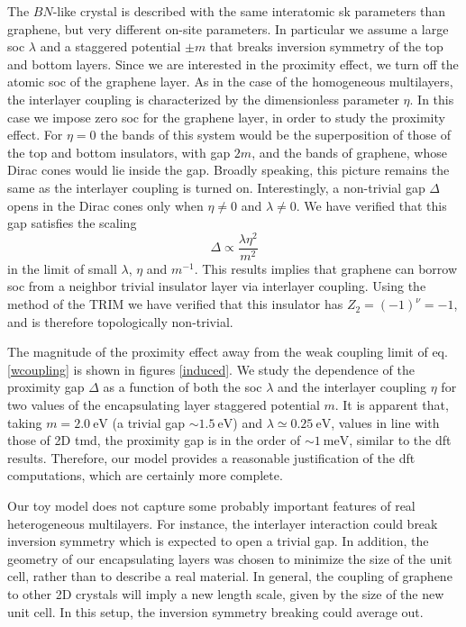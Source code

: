 The $BN$-like crystal is described with the same interatomic \ac{sk} parameters than graphene, but very different on-site parameters. In particular we assume a large \ac{soc} $\lambda$ and a staggered potential $\pm m$ that breaks inversion symmetry of the top and bottom layers.
Since we are interested in the proximity effect, we turn off the atomic \ac{soc} of the graphene layer.
As in the case of the homogeneous multilayers, the interlayer coupling is characterized by the dimensionless parameter $\eta$.   In this case we impose
zero \ac{soc} for the graphene layer, in order to study the proximity effect.   For $\eta=0$ the bands of this system would be the superposition of those of the top and bottom insulators, with gap $2m$, and the bands of graphene, whose Dirac cones would lie inside the gap.  Broadly speaking, this picture remains the same as the interlayer coupling is turned on.    Interestingly, a non-trivial gap $\Delta$  opens in the Dirac cones only when $\eta\neq 0$ and $\lambda\neq 0$.  We have verified that this gap satisfies the  scaling
\begin{equation}
\Delta \propto \frac{\lambda \eta^2}{m^{2}}
\label{wcoupling}
\end{equation}
in the limit of small $\lambda$, $\eta$ and $m^{-1}$. This results implies that graphene can borrow \ac{soc} from a neighbor trivial insulator layer via interlayer coupling. Using the method of the TRIM  we have verified that this insulator has $Z_2=(-1)^{\nu}=-1$, and is therefore topologically non-trivial.

The magnitude of the proximity effect away from the weak coupling limit of eq. \eqref{wcoupling} is shown in figures \ref{induced}.  We study the dependence of the proximity gap $\Delta$ as a function of both the \ac{soc} $\lambda$ and the interlayer coupling $\eta$ for two values of the encapsulating layer  staggered potential $m$. It is apparent that, taking $m=\SI{2.0}{\eV}$ (a trivial gap $\sim\SI{1.5}{\eV}$) and $\lambda \simeq \SI{0.25}{\eV}$, values in line with those of 2D \ac{tmd}, the proximity gap is in the order of
 $\sim\SI{1}{\meV}$, similar to the \ac{dft} results. Therefore, our model provides a reasonable justification of the \ac{dft} computations, which are certainly more complete.

Our  toy model does not capture some probably important features of real heterogeneous multilayers.  For instance,
the interlayer interaction  could break inversion symmetry which is expected to open a trivial gap.  In addition,
the geometry of our encapsulating  layers was  chosen to minimize the size of the unit cell, rather than to describe a real material.  In general, the coupling of graphene to other 2D crystals will imply a new length scale, given by the size of the new unit cell. In this setup, the inversion symmetry breaking could average out.



